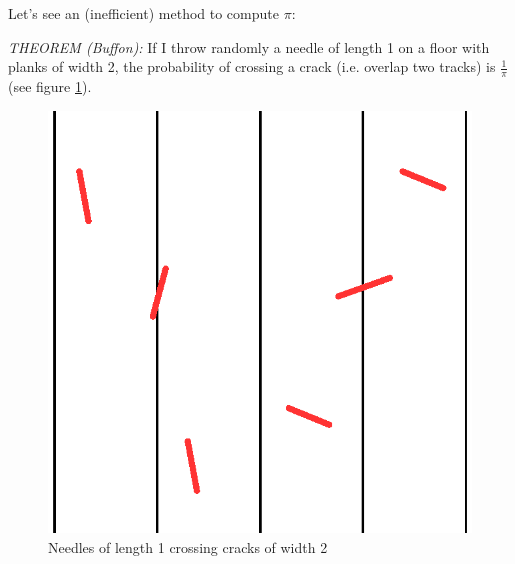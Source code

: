 Let's see an (inefficient) method to compute $\pi$:

\textit{THEOREM (Buffon):} If I throw randomly a needle of length 1 on a floor with planks of width 2, the probability of crossing a crack (i.e. overlap two tracks) is $\frac{1}{\pi}$ (see figure \ref{needles}).


\begin{figure}[h]
\centering
\includegraphics[scale=0.7]{images/needles.eps}
\caption{Needles of length 1 crossing cracks of width 2}
\label{needles}
\end{figure}

